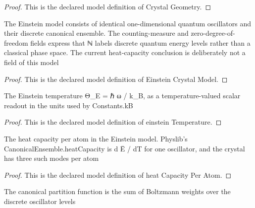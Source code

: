 \begin{proof}
  This is the declared model definition of Crystal Geometry.
\end{proof}
\begin{definition}
  \label{def:physics:phyx-mini-0604:phyxmini0604-einsteincrystalmodel}
  The Einstein model consists of identical one-dimensional quantum oscillators and their discrete canonical ensemble. The counting-measure and zero-degree-of-freedom fields express that ℕ labels discrete quantum energy levels rather than a classical phase space. The current heat-capacity conclusion is deliberately not a field of this model
\end{definition}
\begin{proof}
  This is the declared model definition of Einstein Crystal Model.
\end{proof}
\begin{definition}
  \label{def:physics:phyx-mini-0604:phyxmini0604-einsteintemperature}
  The Einstein temperature Θ\_E = ℏ ω / k\_B, as a temperature-valued scalar readout in the units used by Constants.kB
\end{definition}
\begin{proof}
  This is the declared model definition of einstein Temperature.
\end{proof}
\begin{definition}
  \label{def:physics:phyx-mini-0604:phyxmini0604-heatcapacityperatom}
  The heat capacity per atom in the Einstein model. Physlib's CanonicalEnsemble.heatCapacity is d Ē / dT for one oscillator, and the crystal has three such modes per atom
\end{definition}
\begin{proof}
  This is the declared model definition of heat Capacity Per Atom.
\end{proof}
\begin{theorem}
  \label{thm:physics:phyx-mini-0604:phyxmini0604-partitionfunction-eq-boltzmann-sum}
  The canonical partition function is the sum of Boltzmann weights over the discrete oscillator levels
\end{theorem}

